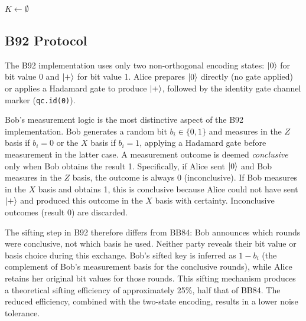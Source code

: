 \documentclass[10pt, a4paper]{report}
\begin{document}
\begin{algorithm}[H]
    \caption{BB84 Key Sifting Procedure}\label{alg:bb84}
    $K \leftarrow \emptyset$\;
\end{algorithm}


\subsection{B92 Protocol}

The B92 implementation uses only two non-orthogonal encoding states: $\ket{0}$ for bit value 0 and $\ket{+}$ for bit value 1. Alice prepares $\ket{0}$ directly (no gate applied) or applies a Hadamard gate to produce $\ket{+}$, followed by the identity gate channel marker (\texttt{qc.id(0)}).

Bob's measurement logic is the most distinctive aspect of the B92 implementation. Bob generates a random bit $b_i \in \{0, 1\}$ and measures in the $Z$ basis if $b_i = 0$ or the $X$ basis if $b_i = 1$, applying a Hadamard gate before measurement in the latter case. A measurement outcome is deemed \textit{conclusive} only when Bob obtains the result 1. Specifically, if Alice sent $\ket{0}$ and Bob measures in the $Z$ basis, the outcome is always 0 (inconclusive). If Bob measures in the $X$ basis and obtains 1, this is conclusive because Alice could not have sent $\ket{+}$ and produced this outcome in the $X$ basis with certainty. Inconclusive outcomes (result 0) are discarded.

The sifting step in B92 therefore differs from BB84: Bob announces which rounds were conclusive, not which basis he used. Neither party reveals their bit value or basis choice during this exchange. Bob's sifted key is inferred as $1 - b_i$ (the complement of Bob's measurement basis for the conclusive rounds), while Alice retains her original bit values for those rounds. This sifting mechanism produces a theoretical sifting efficiency of approximately 25\%, half that of BB84. The reduced efficiency, combined with the two-state encoding, results in a lower noise tolerance.

% 
\end{document}
